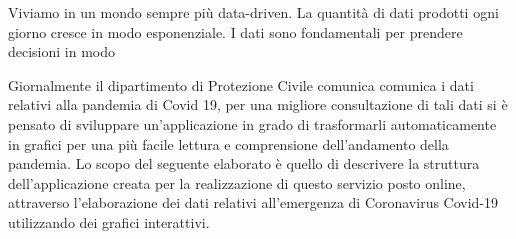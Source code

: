 \setlength{\parskip}{1em}


Viviamo in un mondo sempre più data-driven. La quantità di dati prodotti ogni giorno cresce in modo esponenziale.
I dati sono fondamentali per prendere decisioni in modo



Giornalmente il dipartimento di Protezione Civile comunica comunica i dati relativi alla pandemia di Covid 19, per una migliore consultazione di tali dati si è pensato di sviluppare un’applicazione in grado di trasformarli automaticamente in grafici per una più facile lettura e comprensione dell’andamento della pandemia.
Lo scopo del seguente elaborato è quello di descrivere la struttura dell'applicazione creata per la realizzazione di questo servizio posto online, attraverso l’elaborazione dei dati relativi all’emergenza di Coronavirus Covid-19 utilizzando dei grafici interattivi.
